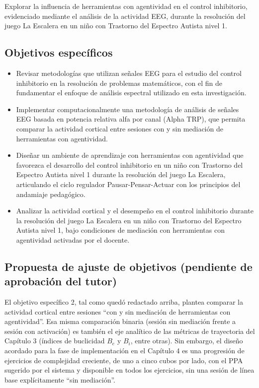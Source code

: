 \documentclass{book}
\begin{document}
Explorar la influencia de herramientas con
agentividad en el control inhibitorio,
evidenciado mediante el análisis de la
actividad EEG, durante la resolución del
juego La Escalera en un niño con
Trastorno del Espectro Autista nivel 1.

\subsection*{Objetivos específicos}

\begin{itemize}

    \item Revisar metodologías que utilizan 
    señales EEG para el estudio del control 
    inhibitorio en la resolución de problemas 
    matemáticos, con el fin de fundamentar 
    el enfoque de análisis espectral utilizado 
    en esta investigación.

    \item Implementar computacionalmente una 
    metodología de análisis de señales EEG 
    basada en potencia relativa alfa por canal 
    (Alpha TRP), que permita comparar la 
    actividad cortical entre sesiones con y 
    sin mediación de herramientas con 
    agentividad.

    \item Diseñar un ambiente de aprendizaje
    con herramientas con agentividad que
    favorezca el desarrollo del control
    inhibitorio en un niño con Trastorno
    del Espectro Autista nivel 1 durante la
    resolución del juego La Escalera,
    articulando el ciclo regulador 
    Pausar-Pensar-Actuar con los principios
    del andamiaje pedagógico.

    \item Analizar la actividad cortical y el
    desempeño en el control inhibitorio durante
    la resolución del juego La Escalera en
    un niño con Trastorno del Espectro
    Autista nivel 1, bajo condiciones de
    mediación con herramientas con agentividad
    activadas por el docente.

\end{itemize}

\subsection*{Propuesta de ajuste de objetivos (pendiente de aprobación del tutor)}

El objetivo específico 2, tal como quedó redactado arriba, plantea comparar la actividad cortical entre sesiones ``con y sin mediación de herramientas con agentividad''. Esa misma comparación binaria (sesión sin mediación frente a sesión con activación) es también el eje analítico de las métricas de trayectoria del Capítulo 3 (índices de buclicidad $B_e$ y $B_i$, entre otras). Sin embargo, el diseño acordado para la fase de implementación en el Capítulo 4 es una progresión de ejercicios de complejidad creciente, de uno a cinco cubos por lado, con el PPA sugerido por el sistema y disponible en todos los ejercicios, sin una sesión de línea base explícitamente ``sin mediación''.
\end{document}
